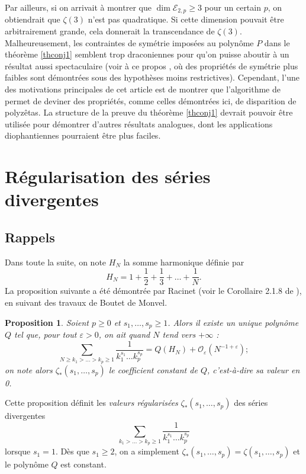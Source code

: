 \documentclass[12pt,francais, reqno]{smfart}
\numberwithin{equation}{section}
\newcommand{\gdo}{\mathcal{O}}
\newcommand{\eps}{\varepsilon}
\newcommand{\zetaetoile}{\zeta _*}
\newcommand{\cale}{{\mathscr{E}}}
\newtheorem{Prop}{Proposition}
\begin{document}
Par ailleurs, si on arrivait \`a montrer que $\dim \cale_{2, p} \geq 3$ pour un certain $p$, on obtiendrait que $\zeta(3)$  n'est pas quadratique. Si cette dimension pouvait \^etre arbitrairement grande, cela donnerait la transcendance de $\zeta(3)$. Malheureusement, les contraintes de sym\'etrie impos\'ees au polyn\^ome $P$ dans le th\'eor\`eme \ref{thconj1} semblent trop draconiennes pour qu'on puisse aboutir \`a un r\'esultat aussi spectaculaire (voir \`a ce propos \cite{SFHoffman}, o\`u des propri\'et\'es de sym\'etrie plus faibles sont d\'emontr\'ees sous des hypoth\`eses moins restrictives). Cependant, l'une des motivations principales de cet article est de montrer que l'algorithme de \cite{CFRalgo} permet de deviner des propri\'et\'es, comme celles d\'emontr\'ees ici, de disparition de polyz\^etas. La structure de la preuve du th\'eor\`eme \ref{thconj1} devrait pouvoir \^etre utilis\'ee pour d\'emontrer d'autres r\'esultats analogues, dont les applications diophantiennes pourraient \^etre plus faciles. 




\section{R\'egularisation des s\'eries divergentes} \label{sec3}

\subsection{Rappels} \label{subsec31}


Dans toute la suite, on note $H_N$ la somme harmonique d\'efinie par 
$$H_N = 1 + \frac12 + \frac13 + \ldots + \frac{1}{N}.$$
La proposition suivante a \'et\'e d\'emontr\'ee par   Racinet (voir le Corollaire 2.1.8 
de \cite{RacinetIHES}), en suivant des travaux de Boutet de Monvel.

\begin{Prop} \label{propstuffle} 
Soient $p \geq 0$ et $s_1, \ldots, s_p \geq 1$. Alors il existe un unique polyn\^ome $Q$ tel que, 
  pour tout $\eps > 0$, on ait quand $N$ tend vers $+\infty$ : 
$$ \sum_{N \geq k_1 > \ldots > k_p \geq 1} 
\frac{1}{k_1 ^{s_1} \ldots k_p ^{s_p}} = Q(H_N) + \gdo_\eps (N^{-1+\eps});
$$
on note alors $\zetaetoile (s_1,\ldots, s_p)$ le coefficient constant de $Q$, c'est-\`a-dire sa valeur en 0.
\end{Prop}

Cette proposition d\'efinit les {\em valeurs r\'egularis\'ees} $\zetaetoile (s_1,\ldots, s_p)$ des s\'eries divergentes 
$$\sum_{ k_1 > \ldots >  k_p \geq 1} 
\frac{1}{k_1 ^{s_1} \ldots k_p ^{s_p}}$$
lorsque $s_1 =1$. D\`es que $s_1 \geq 2$, on a simplement $\zetaetoile (s_1,\ldots, s_p) = \zeta (s_1,\ldots, s_p)$ et le polyn\^ome $Q$ est constant. 
\end{document}
